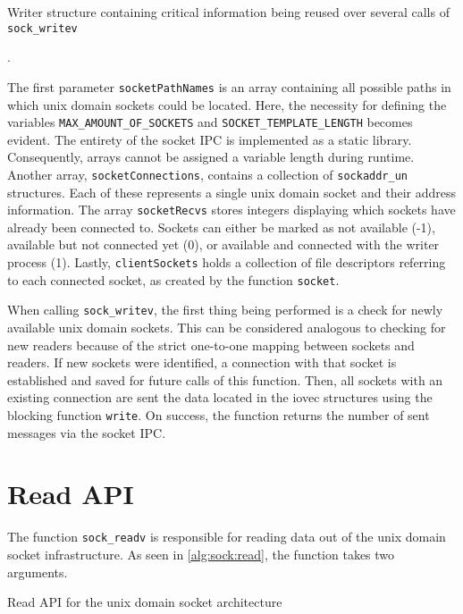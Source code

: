 \begin{algorithm}[h!]
    
    \caption[Socket: Writer structure]{Writer structure containing critical information being reused over several calls of \texttt{sock\_writev}}.
    \label{alg:sock:write:args}
\end{algorithm}

The first parameter \texttt{socketPathNames} is an array containing all possible paths in which unix domain sockets could be located.
Here, the necessity for defining the variables \texttt{MAX\_AMOUNT\_OF\_SOCKETS} and \texttt{SOCKET\_TEMPLATE\_LENGTH} becomes evident.
The entirety of the socket \ac{IPC} is implemented as a static library.
Consequently, arrays cannot be assigned a variable length during runtime.
Another array, \texttt{socketConnections}, contains a collection of \texttt{sockaddr\_un} structures.
Each of these represents a single unix domain socket and their address information.
The array \texttt{socketRecvs} stores integers displaying which sockets have already been connected to.
Sockets can either be marked as not available (-1), available but not connected yet (0), or available and connected with the writer process (1).
Lastly, \texttt{clientSockets} holds a collection of file descriptors referring to each connected socket, as created by the function \texttt{socket}.

When calling \texttt{sock\_writev}, the first thing being performed is a check for newly available unix domain sockets.
This can be considered analogous to checking for new readers because of the strict one-to-one mapping between sockets and readers.
If new sockets were identified, a connection with that socket is established and saved for future calls of this function.
Then, all sockets with an existing connection are sent the data located in the iovec structures using the blocking function \texttt{write}.
On success, the function returns the number of sent messages via the socket \ac{IPC}.

\section{Read \ac{API}}
The function \texttt{sock\_readv} is responsible for reading data out of the unix domain socket infrastructure.
As seen in \ref{alg:sock:read}, the function takes two arguments.

\begin{algorithm}[h!]
    
    \caption[Socket: Read \ac{API}]{Read \ac{API} for the unix domain socket architecture}
    \label{alg:sock:read}
\end{algorithm}


